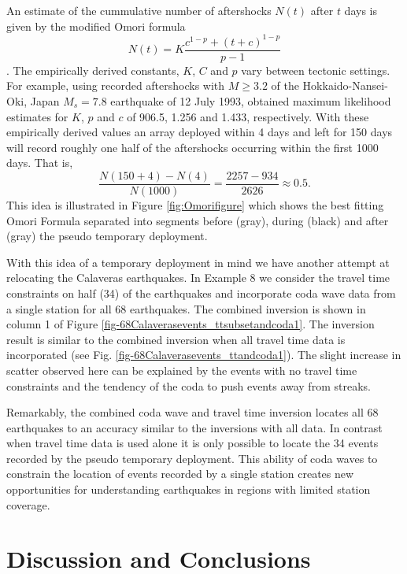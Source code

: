 \documentclass[extra, onecolumn, doublespacing]{gji}
\begin{document}
An estimate of the cummulative number of aftershocks $N(t)$ after
$t$ days is given by the modified Omori formula
\begin{equation}
\label{eq:CumOmori}
 N(t) = K \frac{c^{1-p} + (t+c)^{1-p}}{p-1}
\end{equation}
\citep{dr_Utsu95a}.
The empirically derived constants, $K$, $C$ and $p$ vary between
tectonic settings. For example, using recorded aftershocks with
$M\ge3.2$ of the  Hokkaido-Nansei-Oki, Japan $M_s=7.8$ earthquake of
12 July 1993, \citet{dr_Utsu95a} obtained maximum likelihood
estimates for $K$, $p$ and $c$ of 906.5, 1.256 and 1.433,
respectively.  With these empirically derived values an array
deployed within 4 days and left for 150 days will record roughly one
half of the aftershocks occurring within the first 1000 days. That
is,
\begin{equation}
\frac{N(150+4)-N(4)}{N(1000)} = \frac{2257-934}{2626} \approx 0.5.
\end{equation}
This idea is illustrated in Figure \ref{fig:Omorifigure} which shows
the best fitting Omori Formula separated into segments before
(gray), during (black) and after (gray) the pseudo temporary
deployment.

With this idea of a temporary deployment in mind we have another
attempt at relocating the Calaveras earthquakes. In Example 8 we
consider the travel time constraints on half (34) of the earthquakes
and incorporate coda wave data from a single station for all 68
earthquakes. The combined inversion is shown in column 1 of Figure
\ref{fig-68Calaverasevents_ttsubsetandcoda1}. The inversion result
is similar to the combined inversion when all travel time data is
incorporated (see Fig. \ref{fig-68Calaverasevents_ttandcoda1}). The
slight increase in scatter observed here can be explained by the
events with no travel time constraints and the tendency of the coda
to push events away from streaks.

Remarkably, the combined coda wave and travel time inversion locates
all 68 earthquakes to an accuracy similar to the inversions with all
data. In contrast when travel time data is used alone it is only
possible to locate the 34 events recorded by the pseudo temporary
deployment. This
ability of  coda waves to constrain the location of events recorded
by a single station creates new opportunities for understanding
earthquakes in regions with limited station coverage.


\section{Discussion and Conclusions}
\end{document}
